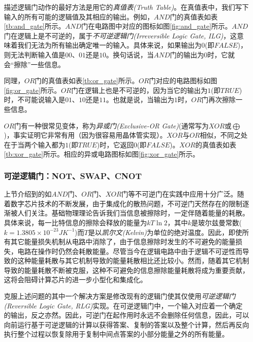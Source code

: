描述逻辑门动作的最好方法是用它的\emph{真值表(Truth Table)}。在真值表中，我们写下输入的所有可能的逻辑值及其相应的输出。例如，$AND$门的真值表如表\ref{tb:and_gate}所示。$AND$门在电路图中对应的图标如图\ref{fig:and_gate}所示。$AND$门在逻辑上是不可逆的，属于\emph{不可逆逻辑门(Irreversible Logic Gate, ILG)}，这意味着我们无法为所有输出确定唯一的输入。具体来说，如果输出为$0$(即$FALSE$)，则无法判断输入值是$00$、$01$还是$10$。换句话说，当$AND$门的输出为$0$时，它就会“擦除”一些信息。

同理，$OR$门的真值表如表\ref{tb:or_gate}所示。$OR$门对应的电路图标如图\ref{fig:or_gate}所示。$OR$门在逻辑上也是不可逆的，因为当它的输出为$1$(即$TRUE$)时，不可能说输入是$01$、$10$还是$11$。也就是说，当输出为$1$时，$OR$门再次擦除一些信息。

$OR$门有一种很常见变体，称为\emph{异或门(Exclusive-OR Gate)}(通常写为$XOR$或$\bigoplus$)，事实证明它非常有用（因为很容易用晶体管实现）。$XOR$与$OR$相似，不同之处在于当两个输入都为$1$(即$TRUE$)时，它返回$0$(即$FALSE$)。$XOR$的真值表如表\ref{tb:xor_gate}所示。相应的异或电路图标如图\ref{fig:xor_gate}所示。




\subsubsection[可逆逻辑门：NOT、SWAP、CNOT]{可逆逻辑门：NOT、SWAP、CNOT}

上节介绍到的如$AND$门、$OR$门、$XOR$门等不可逆门在实践中应用十分广泛。随着数字芯片技术的不断发展，由于集成化的散热问题，不可逆门天然存在的限制逐渐被人们关注。基础物理理论告诉我们当信息被擦除时，一定伴随着能量的耗散\cite[]{Kastner_Schlatter_2023}。具体来说，每一比特信息的擦除会释放的能量为$kT\ln 2$，其中$k$是玻尔兹曼常数($k=1.3805\times 10^{-23}JK^{-1}$)而$T$是以\emph{凯尔文(Kelvin)}为单位的绝对温度。因此，即使所有其它能量损失机制从电路中消除了，由于信息擦除时发生的不可避免的能量损失，电路在操作时仍然会耗散能量。尽管当今在逻辑电路中由于逻辑不可逆性而导致的这种能量耗散与其它机制导致的能量耗散相比还比较小。然而，随着其它机制导致的能量耗散不断被克服，这种不可避免的信息擦除能量耗散将成为重要贡献，这将会阻碍计算芯片的进一步小型化和集成化。

克服上述问题的其中一个解决方案是修改现有的逻辑门使其仅使用\emph{可逆逻辑门(Reversible Logic Gate, RLG)}实现。在可逆逻辑门中，一个输入对应着一个确定的输出，反之亦然。因此，可逆门在起作用时永远不会删除任何信息，因此，可以向前运行基于可逆逻辑的计算以获得答案、复制的答案以及整个计算，然后再反向执行整个过程以恢复除用于复制中间点答案的小部分能量之外的所有能量。

